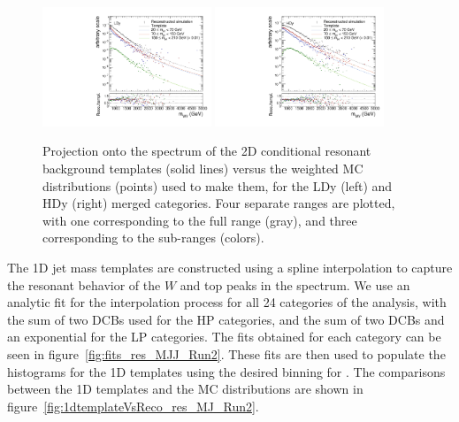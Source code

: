 \begin{figure}[htbp]
  \centering
  \includegraphics[width=0.45\textwidth]{fig/analysis/templateVsReco_resCond_MVV_e_HP_nobb_LDy.pdf}
  \includegraphics[width=0.45\textwidth]{fig/analysis/templateVsReco_resCond_MVV_e_HP_nobb_HDy.pdf}
  \caption{
    Projection onto the \MVV spectrum of the 2D conditional resonant background templates (solid lines) versus the weighted MC distributions (points) used to make them, for the LDy (left) and HDy (right) merged categories.
    Four separate \MJ ranges are plotted, with one corresponding to the full \MJ range (gray), and three corresponding to the sub-ranges (colors).
  }
  \label{fig:condTemplateVscondReco_res_MVV_Run2}
\end{figure}

The 1D jet mass templates are constructed using a spline interpolation to capture the resonant behavior of the $W$ and top peaks in the \MJ spectrum.
We use an analytic fit for the interpolation process for all 24 categories of the analysis, with the sum of two DCBs used for the HP categories, and the sum of two DCBs and an exponential for the LP categories.
The fits obtained for each category can be seen in figure~\ref{fig:fits_res_MJJ_Run2}.
These fits are then used to populate the histograms for the 1D templates using the desired binning for \MJ.
The comparisons between the 1D templates and the MC distributions are shown in figure~\ref{fig:1dtemplateVsReco_res_MJ_Run2}.

